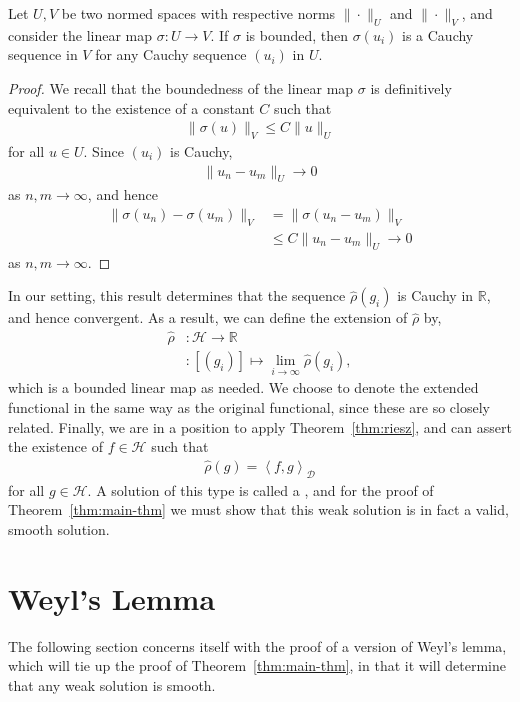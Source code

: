 \begin{lemma}
	Let $ U,V $ be two normed spaces with respective norms $ \|\cdot \|_{U} $ and
	$ \|\cdot \|_{V} $, and consider the linear map $ \sigma:U \to V $. If $
		\sigma $ is bounded, then $ \sigma(u_i) $ is a Cauchy sequence in $ V $ for
	any Cauchy sequence $ (u_i) $ in $ U $.
	\begin{proof}
		We recall that the boundedness of the linear map $ \sigma $ is definitively
		equivalent to the existence of a constant $ C $ such that
		\begin{align*}
			\|\sigma(u)\|_{V} \leq C \|u\|_{U}
		\end{align*}
		for all $ u \in U $. Since $ (u_i) $ is Cauchy,
		\begin{align*}
			\|u_n - u_m\|_{U} \to 0
		\end{align*}
		as $ n,m \to \infty $, and hence
		\begin{align*}
			\|\sigma(u_n) - \sigma(u_m)\|_{V} & = \|\sigma(u_n-u_m)\|_{V}    \\
			                                  & \leq C \|u_n-u_m\|_{U} \to 0
		\end{align*}
		as $ n,m \to \infty $.
	\end{proof}
\end{lemma}

In our setting, this result determines that the sequence $ \hat{\rho}(g_i) $ is
Cauchy in $ \mathbb{R} $, and hence convergent. As a result, we can define the
extension of $
	\hat{\rho} $ by,
\begin{align*}
	\hat{\rho} & : \mathcal{H} \to \mathbb{R}                             \\
	           & : [(g_i)] \mapsto \lim _{i \to \infty}{\hat{\rho}(g_i)},
\end{align*}
which is a bounded linear map as needed. We choose to denote the extended
functional in the same way as the original functional, since these are so
closely related. Finally, we are in a position to apply Theorem~\ref{thm:riesz},
and can assert the existence of $ f \in \mathcal{H} $ such that
\begin{align*}
	\hat{\rho}(g) = \left\langle f,g \right\rangle _{\mathcal{D}}
\end{align*}
for all $ g \in \mathcal{H} $. A solution of this type is called a , and for the proof of Theorem~\ref{thm:main-thm} we must show that
this weak solution is in fact a valid, smooth solution.

\section{Weyl's Lemma}
The following section concerns itself with the proof of a version of Weyl's
lemma, which will tie up the proof of Theorem~\ref{thm:main-thm}, in that it
will determine that any weak solution is smooth.

